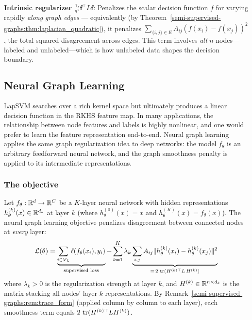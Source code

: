 \begin{notechapter}
\begin{insightbox}
\textbf{Intrinsic regularizer} $\frac{\gamma_I}{n^2}\mathbf{f}^\top L\mathbf{f}$:
Penalizes the scalar decision function $f$ for varying rapidly
\emph{along graph edges} — equivalently (by Theorem~\ref{semi-supervised-graphs:thm:laplacian_quadratic}),
it penalizes $\sum_{\{i,j\}\in E}A_{ij}(f(x_i)-f(x_j))^2$, the total squared
disagreement across edges. This term involves \emph{all} $n$ nodes---labeled
and unlabeled---which is how unlabeled data shapes the decision boundary.
\end{insightbox}

\subsection{Neural Graph Learning}
\label{semi-supervised-graphs:subsec:neural_graph}

LapSVM searches over a rich kernel space but ultimately produces a linear
decision function in the RKHS feature map. In many applications, the
relationship between node features and labels is highly nonlinear, and one
would prefer to learn the feature representation end-to-end. Neural graph
learning~\cite{semi-supervised-graphs:bui2018} applies the same graph regularization idea to deep
networks: the model $f_\theta$ is an arbitrary feedforward neural network, and
the graph smoothness penalty is applied to its intermediate representations.

\subsubsection*{The objective}

Let $f_\theta: \mathbb{R}^d \to \mathbb{R}^C$ be a $K$-layer neural network with hidden
representations $h_\theta^{(k)}(x) \in \mathbb{R}^{d_k}$ at layer $k$ (where
$h_\theta^{(0)}(x) = x$ and $h_\theta^{(K)}(x) = f_\theta(x)$). The neural
graph learning objective penalizes disagreement between connected nodes at
\emph{every} layer:
\begin{equation}
\label{semi-supervised-graphs:eq:neural_graph}
\mathcal{L}(\theta) = \underbrace{\sum_{i \in \mathcal{V}_L}
\ell(f_\theta(x_i), y_i)}_{\text{supervised loss}} +
\sum_{k=1}^K \lambda_k
\underbrace{\sum_{i,j}A_{ij}\|h_\theta^{(k)}(x_i) -
h_\theta^{(k)}(x_j)\|^2}_{= \,2\,\operatorname{tr}(H^{(k)\top} L\, H^{(k)})}
\end{equation}
where $\lambda_k > 0$ is the regularization strength at layer $k$, and
$H^{(k)} \in \mathbb{R}^{n \times d_k}$ is the matrix stacking all nodes' layer-$k$
representations. By Remark~\ref{semi-supervised-graphs:rem:trace_form} (applied column by column to
each layer), each smoothness term equals $2\,\operatorname{tr}(H^{(k)\top} L H^{(k)})$.


\end{notechapter}
